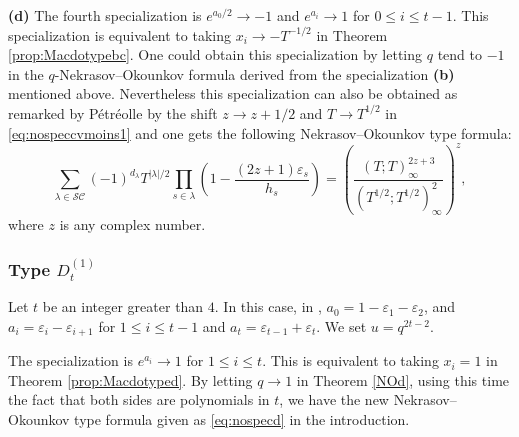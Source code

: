 \documentclass[11pt,letterpaper]{amsart}
\def\ccsc{\mathcal {SC}}
\numberwithin{equation}{section}
\numberwithin{df}{section}
\begin{document}
\textbf{(d)} The fourth specialization is $e^{a_0/2}\to -1$ and $e^{a_i}\to 1$ for $0\leq i\leq t-1$.  This specialization is equivalent to taking $x_i\to-T^{-1/2}$ in Theorem \ref{prop:Macdotypebc}. One could obtain this specialization by letting $q$ tend to $-1$ in the $q$-Nekrasov--Okounkov formula derived from the specialization \textbf{(b)} mentioned above. Nevertheless this specialization can also be obtained as remarked by Pétréolle \cite[Theorem $3.33$]{MP} by the shift $z\to z+1/2$ and $T\to T^{1/2}$ in \eqref{eq:nospeccvmoins1} and one gets the following Nekrasov--Okounkov type formula:
\begin{equation}\label{eq:nospecbcweirdmoins1}
\sum_{\lambda\in\ccsc}(-1)^{d_\lambda}T^{\lvert \lambda\rvert/2}\prod_{s\in\lambda}\left(1-\frac{(2z+1)\varepsilon_s}{h_s}\right)=\left(\frac{\left(T;T\right)_{\infty}^{2z+3}}{\left(T^{1/2};T^{1/2}\right)_{\infty}^{2}}\right)^{z},
\end{equation}
where $z$ is any complex number.

\subsubsection{Type $D^{(1)}_{t}$}
Let $t$ be an integer greater than $4$.
In this case, in \cite{Mac}, $a_0=1-\varepsilon_1-\varepsilon_2$, and $a_i=\varepsilon_i-\varepsilon_{i+1}$ for $1\leq i\leq t-1$ and $a_t=\varepsilon_{t-1}+\varepsilon_t$. We set $u=q^{2t-2}$.

The specialization  is $e^{a_i}\to 1$ for $1\leq i\leq t$. This is equivalent to taking $x_i=1$ in Theorem \ref{prop:Macdotyped}. By letting $q\rightarrow 1$ in Theorem \ref{NOd}, using this time the fact that both sides are polynomials in $t$, we have the new Nekrasov--Okounkov type formula given as \eqref{eq:nospecd} in the introduction.
\end{document}
